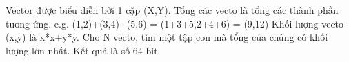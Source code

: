 Vector được biểu diễn bởi 1 cặp (X,Y). Tổng các vecto là tổng các thành phần tương ứng. e.g. (1,2)+(3,4)+(5,6) = (1+3+5,2+4+6) = (9,12)  Khối lượng vecto (x,y) là x*x+y*y.  Cho N vecto, tìm một tập con mà tổng của chúng có khối lượng lớn nhất. Kết quả là số 64 bit.